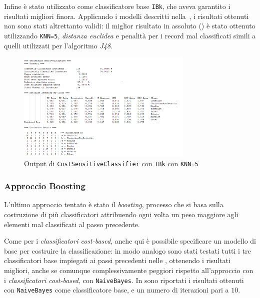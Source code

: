 \documentclass[a4paper,11pt,twoside,notitlepage,final]{scrartcl}
\begin{document}
Infine è stato utilizzato come classificatore base \texttt{IBk}, che aveva garantito i risultati migliori finora.
Applicando i modelli descritti nella~, i risultati ottenuti non sono stati altrettanto validi:
il miglior risultato in assoluto () è stato ottenuto utilizzando \texttt{KNN=5}, \emph{distanza euclidea} e penalità per i record mal classificati simili a quelli utilizzati per l'algoritmo \emph{J48}.

\begin{figure}[H]
  \centering
  \includegraphics[width=0.75\textwidth]{fig/kNNWeighted.PNG}%
  \caption{Output di \texttt{CostSensitiveClassifier} con \texttt{IBk} con \texttt{KNN=5}}%
  \label{fig:cost:ibk5}
\end{figure}

\subsubsection{Approccio Boosting}

L'ultimo approccio tentato è stato il \emph{boosting}, processo che si basa sulla costruzione di più classificatori attribuendo ogni volta un peso maggiore agli elementi mal classificati al passo precedente.

Come per i \emph{classificatori cost-based}, anche qui è possibile specificare un modello di base per costruire la classificazione:
in modo analogo sono stati testati tutti i tre classificatori base impiegati ai passi precedenti nelle ,
ottenendo i risultati migliori, anche se comunque complessivamente peggiori rispetto all'approccio con i \emph{classificatori cost-based}, con \texttt{NaiveBayes}.
In  sono riportati i risultati ottenuti con \texttt{NaiveBayes} come classificatore base, e un numero di iterazioni pari a \(10\).
\end{document}
